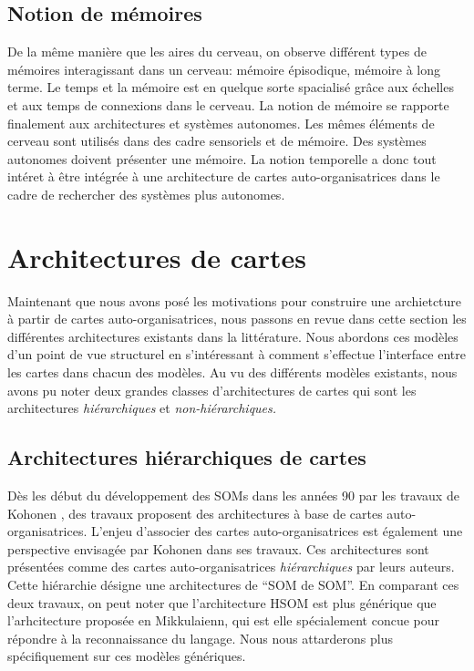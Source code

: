 \documentclass[../main]{subfiles}
\begin{document}
\subsection{Notion de mémoires}

De la même manière que les aires du cerveau, on observe différent types de mémoires interagissant dans un cerveau: mémoire épisodique, mémoire à long terme. Le temps et la mémoire est en quelque sorte spacialisé grâce aux échelles et aux temps de connexions dans le cerveau. 
La notion de mémoire se rapporte finalement aux architectures et systèmes autonomes. Les mêmes éléments de cerveau sont utilisés dans des cadre sensoriels et de mémoire. 
Des systèmes autonomes doivent présenter une mémoire. 
La notion temporelle a donc tout intéret à être intégrée à une architecture de cartes auto-organisatrices dans le cadre de rechercher des systèmes plus autonomes.


\section{Architectures de cartes}

Maintenant que nous avons posé les motivations pour construire une archietcture à partir de cartes auto-organisatrices, nous passons en revue dans cette section les différentes architectures existants dans la littérature. Nous abordons ces modèles d'un point de vue structurel en s'intéressant à comment s'effectue l'interface entre les cartes dans chacun des modèles. 
Au vu des différents modèles existants, nous avons pu noter deux grandes classes d'architectures de cartes qui sont les architectures \emph{hiérarchiques} et  \emph{non-hiérarchiques.}

\subsection{Architectures hiérarchiques de cartes}

Dès les début du développement des SOMs dans les années 90 par les travaux de Kohonen \cite{Kohonen1982,Kohonen1995SelfOrganizingM}, des travaux proposent des architectures à base de cartes auto-organisatrices. L'enjeu d'associer des cartes auto-organisatrices est également une perspective envisagée par Kohonen dans ses travaux.
Ces architectures sont présentées comme des cartes auto-organisatrices \emph{hiérarchiques} par leurs auteurs. 
Cette hiérarchie désigne une architectures de “SOM de SOM”.
En comparant ces deux travaux, on peut noter que l'architecture HSOM est plus générique que l'arhcitecture proposée en Mikkulaienn, qui est elle spécialement concue pour répondre à la reconnaissance du langage. Nous nous attarderons plus spécifiquement sur ces modèles génériques.
\end{document}
